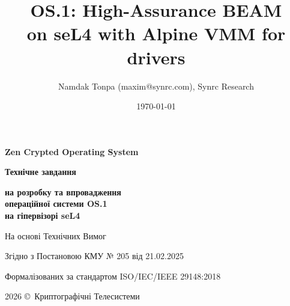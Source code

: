 \documentclass{article}
\title{\textbf{OS.1}: High-Assurance BEAM \\ on seL4 with Alpine VMM for drivers}
\author{Namdak Tonpa (maxim@synrc.com), Synrc Research}
\date{\today}
\newcommand\HUGE[1]{\fontsize{40}{40}\selectfont #1}
\begin{document}
\begin{titlepage}
  \AddToShipoutPictureBG*{\AtPageLowerLeft{\color{nato}\rule{\paperwidth}{\paperheight}}}
  \color{white}\thispagestyle{empty}\vspace*{3cm}\centering
  {\Huge  \textbf{Zen Crypted Operating System} \par} \vspace{1.5cm}
  {\HUGE  \textbf{Технічне завдання} \par} \vspace{1.5cm}
  {\LARGE \textbf{на розробку та впровадження \\ операційної системи OS.1 \\ на гіпервізорі seL4} \par} \vspace{1.5cm}
  {\large На основі Технічних Вимог \par}
  {\large Згідно з Постановою КМУ № 205 від 21.02.2025 \par}
  {\large Формалізованих за стандартом ISO/IEC/IEEE 29148:2018 \par} \vfill
  {\large 2026 \copyright\ Криптографічні Телесистеми \par}
\end{titlepage}

\maketitle
\tableofcontents
\end{document}
